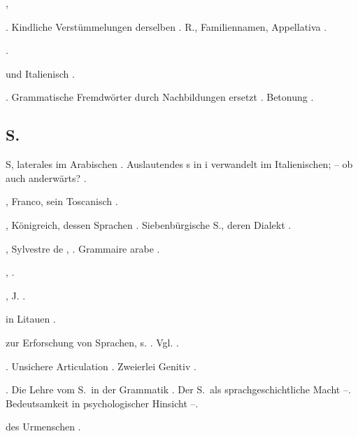\begin{register}

,  

. Kindliche Verstümmelungen derselben \sed{\pageref{sp.207},} \pageref{sp.277}. R., Familiennamen, Appellativa \pageref{sp.307}.

 \pageref{sp.149}.

 und Italienisch \pageref{sp.74}. 

. Grammatische Fremdwörter durch Nachbildungen ersetzt \pageref{sp.263}. Betonung \pageref{sp.431}.

\subsection*{S.}\label{reg.S}

S, laterales im Arabischen \pageref{sp.187}.  Auslautendes s in i verwandelt im Italienischen; – ob auch anderwärts? \pageref{sp.191}.


, Franco, sein Toscanisch \pageref{sp.139}.

, Königreich, dessen Sprachen \pageref{sp.54}. Siebenbürgische S., deren Dialekt \pageref{sp.190}.

, Sylvestre de \pageref{sp.15}, \pageref{sp.31}. Grammaire arabe \pageref{sp.111}.

 \pageref{sp.160}, \pageref{sp.307}.

, J. \pageref{sp.26}.

 in Litauen \pageref{sp.287}.

 zur Erforschung von Sprachen, s. . Vgl. .

. Unsichere Articulation \pageref{sp.193}. Zweierlei Genitiv \pageref{sp.463}.

. Die Lehre vom S.~in der Grammatik \pageref{sp.87}.  Der S.~als sprachgeschichtliche Macht \pageref{sp.196}–\pageref{sp.205}. Bedeutsamkeit in psychologischer Hinsicht \pageref{sp.401}–\pageref{sp.403}.

 des Urmenschen \pageref{sp.309}.


\end{register}
